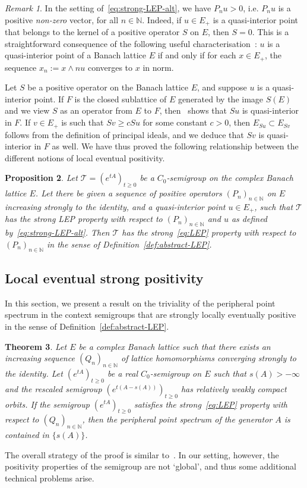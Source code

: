 \documentclass[a4paper, reqno]{amsart}
\numberwithin{equation}{section}
\theoremstyle{plain}
\newtheorem{theorem}{Theorem}[section]
\newtheorem{proposition}[theorem]{Proposition}
\theoremstyle{definition}
\theoremstyle{remark}
\newtheorem{remark}[theorem]{Remark}
\newcommand{\NN}{\mathbb{N}}
\begin{document}
\begin{remark}
	\label{rmk:quasi-int}
	In the setting of~\eqref{eq:strong-LEP-alt}, we have $P_n u>0$, i.e. $P_n u$ is a positive \emph{non-zero} vector, for all $n\in\NN$. Indeed, if $u\in E_+$ is a quasi-interior point that belongs to the kernel of a positive operator $S$ on $E$, then $S=0$. This is a straightforward consequence of the following useful characterisation~\cite[II Theorem 6.3]{Sch}: $u$ is a quasi-interior point of a Banach lattice $E$ if and only if for each $x\in E_+$, the sequence $x_n := x\wedge nu$ converges to $x$ in norm.
\end{remark}
Let $S$ be a positive operator on the Banach lattice $E$, and suppose $u$ is a quasi-interior point. If $F$ is the closed sublattice of $E$ generated by the image $S(E)$ and we view $S$ as an operator from $E$ to $F$, then~\cite[II Proposition 6.4]{Sch} shows that $Su$ is quasi-interior in $F$. If $v\in E_+$ is such that $Sv\ge cSu$ for some constant $c>0$, then $E_{Su}\subset E_{Sv}$ follows from the definition of principal ideals, and we deduce that $Sv$ is quasi-interior in $F$ as well. We have thus proved the following relationship between the different notions of local eventual positivity.
\begin{proposition}
	Let $\mathcal{T}=(e^{tA})_{t\ge 0}$ be a $C_0$-semigroup on the complex Banach lattice $E$. Let there be given a sequence of positive operators $(P_n)_{n\in\NN}$ on $E$ increasing strongly to the identity, and a quasi-interior point $u\in E_+$, such that $\mathcal{T}$ has the strong LEP property with respect to $(P_n)_{n\in\NN}$ and $u$ as defined by~\eqref{eq:strong-LEP-alt}. Then $\mathcal{T}$ has the strong~\eqref{eq:LEP} property with respect to $(P_n)_{n\in\NN}$ in the sense of Definition~\ref{def:abstract-LEP}.
\end{proposition}

\subsection{Local eventual strong positivity}
\label{sec:LEP-strong}
In this section, we present a result on the triviality of the peripheral point spectrum in the context semigroups that are strongly locally eventually positive in the sense of Definition~\ref{def:abstract-LEP}.
\begin{theorem}
\label{thm:strong-pos}
	Let $E$ be a complex Banach lattice such that there exists an increasing sequence $(Q_n)_{n\in\NN}$ of lattice homomorphisms converging strongly to the identity. Let $(e^{tA})_{t\ge 0}$ be a real $C_0$-semigroup on $E$ such that $s(A)>-\infty$ and the rescaled semigroup $(e^{t(A-s(A))})_{t\ge 0}$ has relatively weakly compact orbits. If the semigroup $(e^{tA})_{t\ge 0}$ satisfies the \emph{strong}~\eqref{eq:LEP} property with respect to $(Q_n)_{n\in\NN}$, then the peripheral point spectrum of the generator $A$ is contained in $\{s(A)\}$.
\end{theorem}
The overall strategy of the proof is similar to~\cite[Theorem 6.3.2]{GTh}. In our setting, however, the positivity properties of the semigroup are not `global', and thus some additional technical problems arise.
\end{document}
